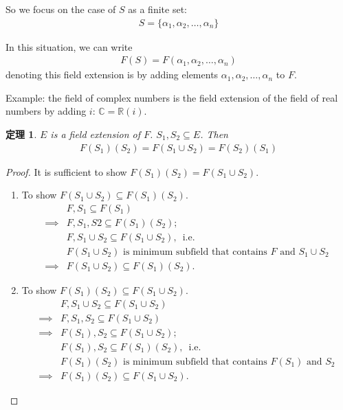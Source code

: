 \documentclass[utf8]{ctexbook}
\newtheorem{theorem}{定理}[section]
\begin{document}
So we focus on the case of $S$ as a finite set:
\begin{align*}
S = \{ \alpha_1, \alpha_2, \ldots, \alpha_n \}
\end{align*}

In this situation, we can write
\begin{align*}
F(S) = F(\alpha_1, \alpha_2, \ldots, \alpha_n )
\end{align*}
denoting this field extension is by adding elements $\alpha_1, \alpha_2, \ldots, \alpha_n $ to $F$.

Example: the field of complex numbers is the field extension of the field of real numbers by adding $i$: $\mathbb{C} = \mathbb{R}(i)$.


\begin{theorem}
\label{thm_4_3_field_extension_sets_union}
$E$ is a field extension of $F$. $S_1, S_2 \subseteq E$. Then
\begin{align*}
F(S_1)(S_2) = F(S_1 \cup S_2) = F(S_2)(S_1)
\end{align*}
\end{theorem}

\begin{proof}
It is sufficient to show $F(S_1)(S_2) = F(S_1 \cup S_2)$.

\begin{enumerate}
\item{To show $F(S_1 \cup S_2) \subseteq F(S_1)(S_2)$.
\begin{align*}
& F, S_1 \subseteq F(S_1) \\
\implies & F, S_1, S2 \subseteq F(S_1)(S_2) ; \\
& F, S_1 \cup S_2 \subseteq F(S_1 \cup S_2),\, \mbox{ i.e.} \\
& F(S_1 \cup S_2) \mbox{ is minimum subfield that contains $F$ and $S_1 \cup S_2$} \\
\implies & F(S_1 \cup S_2) \subseteq F(S_1)(S_2).
\end{align*}

}
\item{To show $ F(S_1)(S_2) \subseteq F(S_1 \cup S_2)$.
\begin{align*}
& F, S_1 \cup S_2 \subseteq F(S_1 \cup S_2) \\
\implies & F, S_1, S_2 \subseteq F(S_1 \cup S_2) \\
\implies & F(S_1), S_2 \subseteq F(S_1 \cup S_2); \\
& F(S_1), S_2 \subseteq F(S_1)(S_2),\, \mbox{ i.e.}  \\
& F(S_1 )( S_2) \mbox{ is minimum subfield that contains $F(S_1)$ and $S_2$} \\
\implies &  F(S_1 )( S_2) \subseteq F(S_1 \cup S_2) .
\end{align*}
}
\end{enumerate}

\end{proof}
\end{document}
